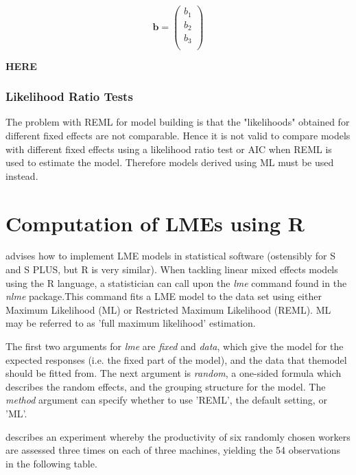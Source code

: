 \documentclass[12pt, a4paper]{report}
\theoremstyle{plain}
\theoremstyle{definition}
\theoremstyle{remark}
\begin{document}
\begin{equation}
\textbf{b}= \left( \begin{array}{c}
b_{1} \\
b_{2} \\
b_{3} \\
\end{array}  \right)
\end{equation}

\textbf{HERE}



\subsubsection{Likelihood Ratio Tests} The problem with REML for
model building is that the "likelihoods" obtained for different
fixed effects are not comparable. Hence it is not valid to compare
models with different fixed effects using a likelihood ratio test
or AIC when REML is used to estimate the model. Therefore models
derived using ML must be used instead.





\section{Computation of LMEs using R} \cite{PB} advises how to
implement LME models in statistical software (ostensibly for S and
S PLUS, but R is very similar). When tackling linear mixed effects
models using the R language, a statistician can call upon the
\emph{lme} command found in the \emph{nlme} package.This command
fits a LME model to the data set using either Maximum Likelihood
(ML) or Restricted Maximum Likelihood (REML). ML may be referred
to as 'full maximum likelihood' estimation.

The first two arguments for \emph{lme} are \emph{fixed} and
\emph{data}, which give the model for the expected responses (i.e.
the fixed part of the model), and the data that themodel should be
fitted from. The next argument is  \emph{random}, a one-sided
formula which describes the random effects, and the grouping
structure for the model. The  \emph{method} argument can specify
whether to use 'REML', the default setting, or 'ML'.

\citet{PB} describes an experiment whereby the productivity of six
randomly chosen workers are assessed three times on each of three
machines, yielding the 54 observations in the following table.
\end{document}
